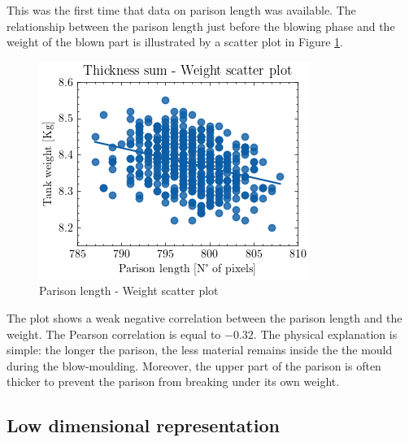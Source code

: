 This was the first time that data on parison length was available. The relationship between the parison length just before the blowing phase and the weight of the blown part is illustrated by a scatter plot in Figure \ref{fig:length_weight_scatter}.
%
\begin{figure}
\centerline{\includegraphics[scale=1.2]{images/chapter_3/length_weight_scatter.png}}
\caption{Parison length - Weight scatter plot}
\label{fig:length_weight_scatter}
\end{figure}
%
The plot shows a weak  negative correlation between the parison length and the weight. The Pearson correlation is equal to $-0.32$. The physical explanation is simple: the longer the parison, the less material remains inside the the mould during the blow-moulding. Moreover, the upper part of the parison is often thicker to prevent the parison from breaking under its own weight.  

\subsection{Low dimensional representation} \label{Principal Component Analysis for data exploration}

